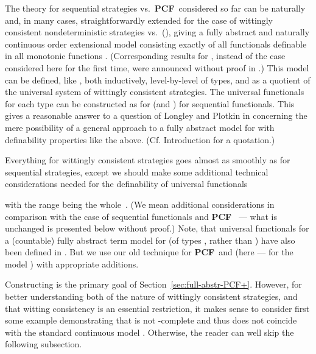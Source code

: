 \documentclass[fleqn]{LMCS}
\theoremstyle{plain}\newtheorem{satz}[thm]{Satz}
\theoremstyle{plain}\newtheorem{hyp}[thm]{Hypothesis}
\theoremstyle{plain}\newtheorem{hyps}[thm]{Hypotheses}
\theoremstyle{definition}\newtheorem{note}[thm]{Note}
\newcommand{\PCF}{\mbox{\bf PCF}}
\newcommand{\?}{\mbox{?}}
\begin{document}
The theory for sequential strategies vs.\ \PCF\ considered so far can be 
naturally and, in many cases, straightforwardly 
extended for the case of wittingly consistent nondeterministic strategies 
vs.\  (), 
giving a fully abstract and naturally continuous order extensional 
model  
consisting exactly of all functionals definable in 
  all monotonic functions 
\mbox{}. 
(Corresponding results for , instead of the case 
 considered here for the first time, 
were announced without proof 
in \cite{Saz76t}.) 
This model can be defined, like , both inductively, level-by-level 
of types, 
and as a quotient  of the universal system  
of wittingly consistent strategies. The universal functionals 
 for each type 
can be constructed as for  (and ) for sequential functionals. 
This gives a reasonable answer to a 
question of Longley and Plotkin in \cite{Longley-Plotkin} 
concerning the mere possibility of a general approach 
to a fully abstract model for  with 
definability properties like the above. 
(Cf. Introduction for a quotation.) 

Everything for wittingly consistent strategies goes almost as smoothly 
as for sequential strategies, except we should make some additional 
technical 
considerations needed for the definability of universal functionals 

with the range being the whole~. 
(We mean additional considerations 
in comparison with the case of sequential functionals and \PCF\ 
\cite{Saz76AL} --- what is unchanged 
is presented below without proof.) 
Note, that universal functionals for 
a (countable) fully abstract term model for  
(of types , rather than ) 
have also been defined in \cite{Longley-Plotkin}. But we use our old 
technique for \PCF\ and 
(here --- for the model ) 
with appropriate additions. 

Constructing  is the primary goal of 
Section~\ref{sec:full-abstr-PCF+}. 
However, for better understanding both of the nature of wittingly consistent 
strategies, and that witting consistency is an essential restriction, 
it makes sense to consider first some example demonstrating 
that  is not -complete and thus does not coincide with 
the standard continuous model . 
Otherwise, the reader can well skip the following subsection. 
\end{document}
